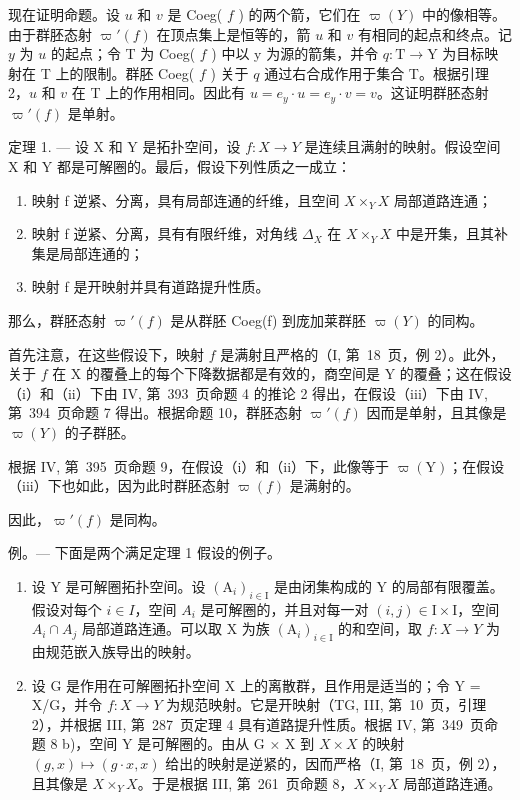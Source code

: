 现在证明命题。设 \(u\) 和 \(v\) 是 Coeg( \(f\) ) 的两个箭，它们在 \(\varpi(Y)\) 中的像相等。由于群胚态射 \(\varpi'(f)\) 在顶点集上是恒等的，箭 \(u\) 和 \(v\) 有相同的起点和终点。记 \(y\) 为 \(u\) 的起点；令 T 为 Coeg( \(f\) ) 中以 y 为源的箭集，并令 \(q: \mathrm{T} \to \mathrm{Y}\) 为目标映射在 T 上的限制。群胚 Coeg( \(f\) ) 关于 \(q\) 通过右合成作用于集合 T。根据引理 2，\(u\) 和 \(v\) 在 T 上的作用相同。因此有 \(u = e_y \cdot u = e_y \cdot v = v\)。这证明群胚态射 \(\varpi'(f)\) 是单射。

定理 1. --- 设 X 和 Y 是拓扑空间，设 \(f: X \to Y\) 是连续且满射的映射。假设空间 X 和 Y 都是可解圈的。最后，假设下列性质之一成立：

\begin{enumerate}
\def\labelenumi{(\roman{enumi})}
\item
  映射 f 逆紧、分离，具有局部连通的纤维，且空间 \(X\times_{Y}X\) 局部道路连通；
\item
  映射 f 逆紧、分离，具有有限纤维，对角线 \(\Delta_{X}\) 在 \(X \times_{Y} X\) 中是开集，且其补集是局部连通的；
\item
  映射 f 是开映射并具有道路提升性质。
\end{enumerate}

那么，群胚态射 \(\varpi'(f)\) 是从群胚 Coeg(f) 到庞加莱群胚 \(\varpi(Y)\) 的同构。

首先注意，在这些假设下，映射 \(f\) 是满射且严格的（I, 第~18~页，例 2）。此外，关于 \(f\) 在 X 的覆叠上的每个下降数据都是有效的，商空间是 Y 的覆叠；这在假设（i）和（ii）下由 IV, 第~393~页命题 4 的推论 2 得出，在假设（iii）下由 IV, 第~394~页命题 7 得出。根据命题 10，群胚态射 \(\varpi'(f)\) 因而是单射，且其像是 \(\varpi(Y)\) 的子群胚。

根据 IV, 第~395~页命题 9，在假设（i）和（ii）下，此像等于 \(\varpi(\mathrm{Y})\)；在假设（iii）下也如此，因为此时群胚态射 \(\varpi(f)\) 是满射的。

因此，\(\varpi'(f)\) 是同构。

例。--- 下面是两个满足定理 1 假设的例子。

\begin{enumerate}
\def\labelenumi{\arabic{enumi})}
\item
  设 Y 是可解圈拓扑空间。设 \((\mathrm{A}_{i})_{i\in\mathrm{I}}\) 是由闭集构成的 Y 的局部有限覆盖。假设对每个 \(i\in I\)，空间 \(A_{i}\) 是可解圈的，并且对每一对 \((i,j)\in\mathrm{I}\times\mathrm{I}\)，空间 \(A_{i}\cap A_{j}\) 局部道路连通。可以取 X 为族 \((\mathrm{A}_{i})_{i\in\mathrm{I}}\) 的和空间，取 \(f:X\to Y\) 为由规范嵌入族导出的映射。
\item
  设 G 是作用在可解圈拓扑空间 X 上的离散群，且作用是适当的；令 Y = X/G，并令 \(f: X \to Y\) 为规范映射。它是开映射（TG, III, 第~10~页，引理 2），并根据 III, 第~287~页定理 4 具有道路提升性质。根据 IV, 第~349~页命题 8 b)，空间 Y 是可解圈的。由从 G × X 到 \(X\times X\) 的映射 \((g, x) \mapsto (g \cdot x, x)\) 给出的映射是逆紧的，因而严格（I, 第~18~页，例 2），且其像是 \(X\times_{Y}X\)。于是根据 III, 第~261~页命题 8，\(X\times_{Y}X\) 局部道路连通。
\end{enumerate}

